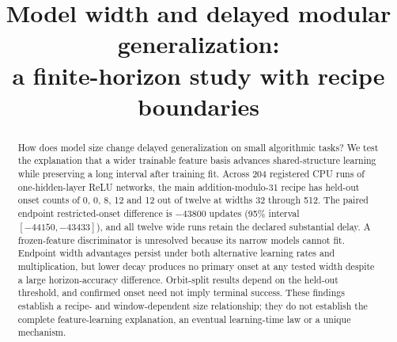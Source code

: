 \documentclass{article}
\title{Model width and delayed modular generalization:\\a finite-horizon study with recipe boundaries}
\author{}
\begin{document}
\maketitle
\begin{abstract}
How does model size change delayed generalization on small algorithmic tasks? We test the explanation that a wider trainable feature basis advances shared-structure learning while preserving a long interval after training fit. Across 204 registered CPU runs of one-hidden-layer ReLU networks, the main addition-modulo-31 recipe has held-out onset counts of 0, 0, 8, 12 and 12 out of twelve at widths 32 through 512. The paired endpoint restricted-onset difference is $-43800$ updates (95\% interval $[-44150,-43433]$), and all twelve wide runs retain the declared substantial delay. A frozen-feature discriminator is unresolved because its narrow models cannot fit. Endpoint width advantages persist under both alternative learning rates and multiplication, but lower decay produces no primary onset at any tested width despite a large horizon-accuracy difference. Orbit-split results depend on the held-out threshold, and confirmed onset need not imply terminal success. These findings establish a recipe- and window-dependent size relationship; they do not establish the complete feature-learning explanation, an eventual learning-time law or a unique mechanism.
\end{abstract}








\clearpage


\clearpage
\appendix

\clearpage

\clearpage

\clearpage

\end{document}
